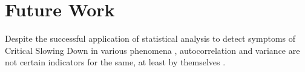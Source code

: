 \section[Future Work]{Future Work}
\label{sec:future}

Despite the successful application of statistical analysis to detect symptoms of Critical Slowing Down in various phenomena \cite{schefferEarlyWarningSignalsForCriticalTransitions}, autocorrelation and variance are not certain indicators for the same, at least by themselves \cite{csdNotDetectedByAutocorrAndVariance01}.
